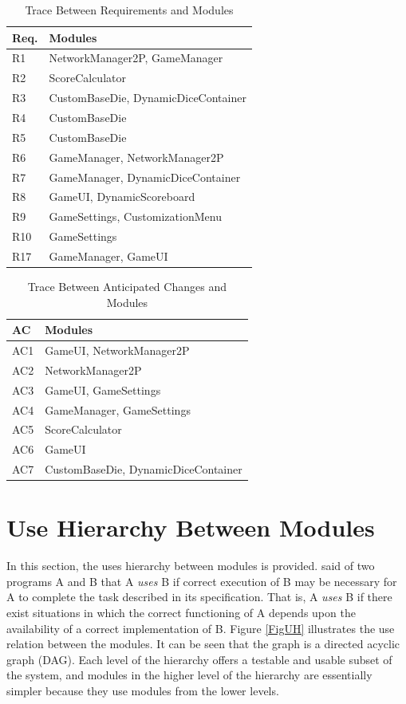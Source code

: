 \documentclass[12pt, titlepage]{article}
\begin{document}
\begin{table}[H]
  \centering
  \begin{tabular}{p{} p{}}
  \toprule
  \textbf{Req.} & \textbf{Modules}\\
  \midrule
  R1 & NetworkManager2P, GameManager\\
  R2 & ScoreCalculator\\
  R3 & CustomBaseDie, DynamicDiceContainer\\
  R4 & CustomBaseDie\\
  R5 & CustomBaseDie\\
  R6 & GameManager, NetworkManager2P\\
  R7 & GameManager, DynamicDiceContainer\\
  R8 & GameUI, DynamicScoreboard\\
  R9 & GameSettings, CustomizationMenu\\
  R10 & GameSettings\\
  R17 & GameManager, GameUI\\
  \bottomrule
  \end{tabular}
  \caption{Trace Between Requirements and Modules}
  \label{TblRT}
  \end{table}
  
  \begin{table}[H]
  \centering
  \begin{tabular}{p{} p{}}
  \toprule
  \textbf{AC} & \textbf{Modules}\\
  \midrule
  AC1 & GameUI, NetworkManager2P\\
  AC2 & NetworkManager2P\\
  AC3 & GameUI, GameSettings\\
  AC4 & GameManager, GameSettings\\
  AC5 & ScoreCalculator\\
  AC6 & GameUI\\
  AC7 & CustomBaseDie, DynamicDiceContainer\\
  \bottomrule
  \end{tabular}
  \caption{Trace Between Anticipated Changes and Modules}
  \label{TblACT}
  \end{table}

\section{Use Hierarchy Between Modules} \label{SecUse}

In this section, the uses hierarchy between modules is
provided. \citet{Parnas1978} said of two programs A and B that A {\em uses} B if
correct execution of B may be necessary for A to complete the task described in
its specification. That is, A {\em uses} B if there exist situations in which
the correct functioning of A depends upon the availability of a correct
implementation of B.  Figure \ref{FigUH} illustrates the use relation between
the modules. It can be seen that the graph is a directed acyclic graph
(DAG). Each level of the hierarchy offers a testable and usable subset of the
system, and modules in the higher level of the hierarchy are essentially simpler
because they use modules from the lower levels.
\end{document}
